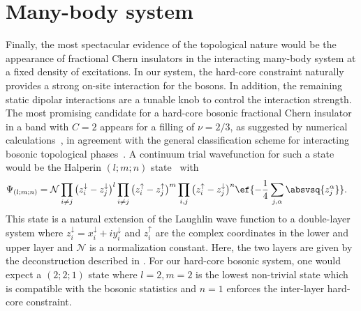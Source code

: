 \section{Many-body system}
Finally, the most spectacular evidence of the topological nature would be the appearance of fractional Chern insulators in the interacting many-body system at a fixed density of excitations.
In our system, the hard-core constraint naturally provides a strong on-site interaction for the bosons.
In addition, the remaining static dipolar interactions are a tunable knob to control the interaction strength.
The most promising candidate for a hard-core bosonic fractional Chern insulator in a band with $C=2$ appears for a filling of $\nu = 2/3$, as suggested by numerical calculations~\cite{Moller2009,Wang2012a}, in agreement with the general classification scheme for interacting bosonic topological phases~\cite{Lu2012a,Chen2013}.
A continuum trial wavefunction for such a state would be the Halperin $(l;m;n)$ state~\cite{Halperin1984,Wu2013,Yao2013,Wang2012a,Wang2011} with
\begin{align}
    \Psi_{(l;m;n)} &= \mathcal{N}
    \prod_{i\ne j} \big(z_i^\downarrow - z_j^\downarrow\big)^l
    \prod_{i\ne j} \big(z_i^\uparrow -   z_j^\uparrow  \big)^m
    \prod_{i, j} \big(z_i^\uparrow -   z_j^\downarrow\big)^n
    \ef{-\frac{1}{4}\sum_{j,\alpha} \absvsq{z^\alpha_j} }.
\end{align}
This state is a natural extension of the Laughlin wave function to a double-layer system where $z_i^\downarrow=x_i^\downarrow+i y_i^\downarrow$ and $z_i^\uparrow$ are the complex coordinates in the lower and upper layer and $\mathcal{N}$ is a normalization constant.
Here, the two layers are given by the deconstruction described in .
For our hard-core bosonic system, one would expect a $(2;2;1)$ state where $l=2, m=2$ is the lowest non-trivial state which is compatible with the bosonic statistics and $n=1$ enforces the inter-layer hard-core constraint.
